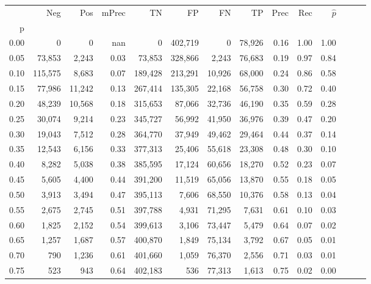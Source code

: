\begin{tabular}{rrrrrrrrrrrrrr}
\toprule
{} &      Neg &     Pos & mPrec &       TN &       FP &      FN &      TP &  Prec &   Rec & $\hat{p}$ \\
p    &          &         &       &          &          &         &         &       &       &           \\
\midrule
0.00 &        0 &       0 &   nan &        0 &  402,719 &       0 &  78,926 &  0.16 &  1.00 &      1.00 \\
0.05 &   73,853 &   2,243 &  0.03 &   73,853 &  328,866 &   2,243 &  76,683 &  0.19 &  0.97 &      0.84 \\
0.10 &  115,575 &   8,683 &  0.07 &  189,428 &  213,291 &  10,926 &  68,000 &  0.24 &  0.86 &      0.58 \\
0.15 &   77,986 &  11,242 &  0.13 &  267,414 &  135,305 &  22,168 &  56,758 &  0.30 &  0.72 &      0.40 \\
0.20 &   48,239 &  10,568 &  0.18 &  315,653 &   87,066 &  32,736 &  46,190 &  0.35 &  0.59 &      0.28 \\
0.25 &   30,074 &   9,214 &  0.23 &  345,727 &   56,992 &  41,950 &  36,976 &  0.39 &  0.47 &      0.20 \\
0.30 &   19,043 &   7,512 &  0.28 &  364,770 &   37,949 &  49,462 &  29,464 &  0.44 &  0.37 &      0.14 \\
0.35 &   12,543 &   6,156 &  0.33 &  377,313 &   25,406 &  55,618 &  23,308 &  0.48 &  0.30 &      0.10 \\
0.40 &    8,282 &   5,038 &  0.38 &  385,595 &   17,124 &  60,656 &  18,270 &  0.52 &  0.23 &      0.07 \\
0.45 &    5,605 &   4,400 &  0.44 &  391,200 &   11,519 &  65,056 &  13,870 &  0.55 &  0.18 &      0.05 \\
0.50 &    3,913 &   3,494 &  0.47 &  395,113 &    7,606 &  68,550 &  10,376 &  0.58 &  0.13 &      0.04 \\
0.55 &    2,675 &   2,745 &  0.51 &  397,788 &    4,931 &  71,295 &   7,631 &  0.61 &  0.10 &      0.03 \\
0.60 &    1,825 &   2,152 &  0.54 &  399,613 &    3,106 &  73,447 &   5,479 &  0.64 &  0.07 &      0.02 \\
0.65 &    1,257 &   1,687 &  0.57 &  400,870 &    1,849 &  75,134 &   3,792 &  0.67 &  0.05 &      0.01 \\
0.70 &      790 &   1,236 &  0.61 &  401,660 &    1,059 &  76,370 &   2,556 &  0.71 &  0.03 &      0.01 \\
0.75 &      523 &     943 &  0.64 &  402,183 &      536 &  77,313 &   1,613 &  0.75 &  0.02 &      0.00 \\

\end{tabular}
